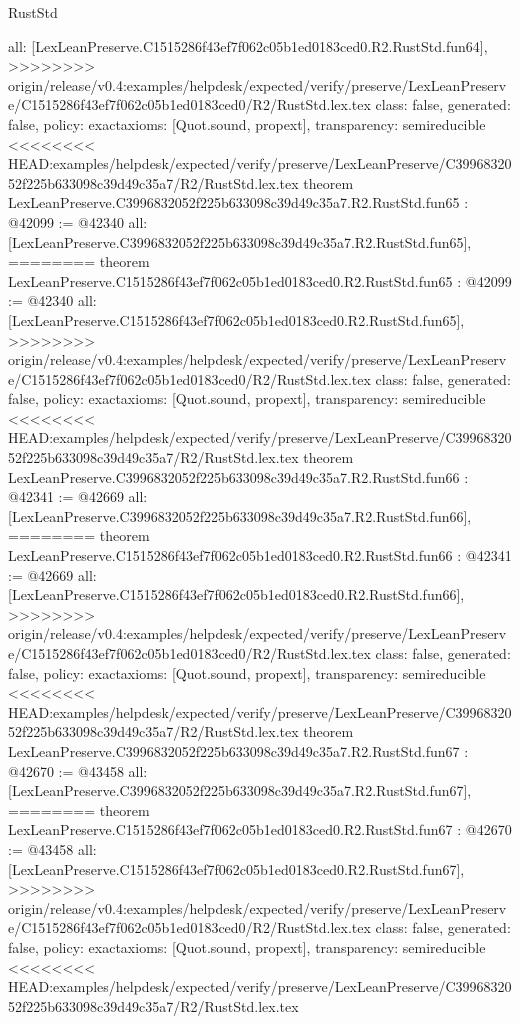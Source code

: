 \begin{lexlean}{RustStd}
\begin{coremodule}
{\begin{coremodule}
{{{{{{{{{{{{{{{{{{{{{{{{{{{{{{{{{{{{{{{{{{{{{{{{{{{{{{{{{{{{{{{{{{{{  all: [LexLeanPreserve.C1515286f43ef7f062c05b1ed0183ced0.R2.RustStd.fun64],
>>>>>>>> origin/release/v0.4:examples/helpdesk/expected/verify/preserve/LexLeanPreserve/C1515286f43ef7f062c05b1ed0183ced0/R2/RustStd.lex.tex
  class: false,
  generated: false,
  policy: exact{axioms: [Quot.sound, propext]},
  transparency: semireducible
}
<<<<<<<< HEAD:examples/helpdesk/expected/verify/preserve/LexLeanPreserve/C3996832052f225b633098c39d49c35a7/R2/RustStd.lex.tex
theorem LexLeanPreserve.C3996832052f225b633098c39d49c35a7.R2.RustStd.fun65 : @42099 := @42340 {
  all: [LexLeanPreserve.C3996832052f225b633098c39d49c35a7.R2.RustStd.fun65],
========
theorem LexLeanPreserve.C1515286f43ef7f062c05b1ed0183ced0.R2.RustStd.fun65 : @42099 := @42340 {
  all: [LexLeanPreserve.C1515286f43ef7f062c05b1ed0183ced0.R2.RustStd.fun65],
>>>>>>>> origin/release/v0.4:examples/helpdesk/expected/verify/preserve/LexLeanPreserve/C1515286f43ef7f062c05b1ed0183ced0/R2/RustStd.lex.tex
  class: false,
  generated: false,
  policy: exact{axioms: [Quot.sound, propext]},
  transparency: semireducible
}
<<<<<<<< HEAD:examples/helpdesk/expected/verify/preserve/LexLeanPreserve/C3996832052f225b633098c39d49c35a7/R2/RustStd.lex.tex
theorem LexLeanPreserve.C3996832052f225b633098c39d49c35a7.R2.RustStd.fun66 : @42341 := @42669 {
  all: [LexLeanPreserve.C3996832052f225b633098c39d49c35a7.R2.RustStd.fun66],
========
theorem LexLeanPreserve.C1515286f43ef7f062c05b1ed0183ced0.R2.RustStd.fun66 : @42341 := @42669 {
  all: [LexLeanPreserve.C1515286f43ef7f062c05b1ed0183ced0.R2.RustStd.fun66],
>>>>>>>> origin/release/v0.4:examples/helpdesk/expected/verify/preserve/LexLeanPreserve/C1515286f43ef7f062c05b1ed0183ced0/R2/RustStd.lex.tex
  class: false,
  generated: false,
  policy: exact{axioms: [Quot.sound, propext]},
  transparency: semireducible
}
<<<<<<<< HEAD:examples/helpdesk/expected/verify/preserve/LexLeanPreserve/C3996832052f225b633098c39d49c35a7/R2/RustStd.lex.tex
theorem LexLeanPreserve.C3996832052f225b633098c39d49c35a7.R2.RustStd.fun67 : @42670 := @43458 {
  all: [LexLeanPreserve.C3996832052f225b633098c39d49c35a7.R2.RustStd.fun67],
========
theorem LexLeanPreserve.C1515286f43ef7f062c05b1ed0183ced0.R2.RustStd.fun67 : @42670 := @43458 {
  all: [LexLeanPreserve.C1515286f43ef7f062c05b1ed0183ced0.R2.RustStd.fun67],
>>>>>>>> origin/release/v0.4:examples/helpdesk/expected/verify/preserve/LexLeanPreserve/C1515286f43ef7f062c05b1ed0183ced0/R2/RustStd.lex.tex
  class: false,
  generated: false,
  policy: exact{axioms: [Quot.sound, propext]},
  transparency: semireducible
}
<<<<<<<< HEAD:examples/helpdesk/expected/verify/preserve/LexLeanPreserve/C3996832052f225b633098c39d49c35a7/R2/RustStd.lex.tex
}}}}}}}}}}}}}}}}}}}}}}}}}}}}}}}}}}}}}}}}}}}}}}}}}}}}}}}}}}}}}}}}}}}}}}
\end{coremodule}}
\end{coremodule}
\end{lexlean}
